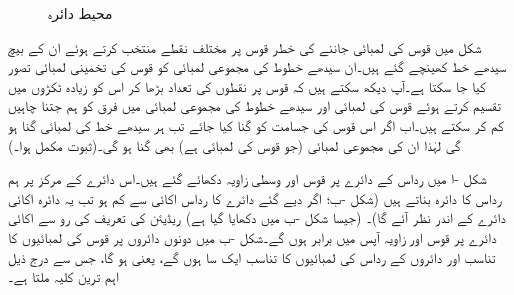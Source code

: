 \begin{figure}
\centering
\begin{minipage}{0.45\textwidth}
\centering
{}
\caption{قوس کی لمبائی}
\label{شکل_ابتدا_قوس_لمبائی}
\end{minipage}\hfill
\begin{minipage}{0.45\textwidth}
\centering
\centering
{}
\caption{محیط دائرہ}
\label{شکل_ابتدا_دائرہ_اور_ریڈیئن}
\end{minipage}%
\end{figure}

شکل  میں قوس کی لمبائی جاننے کی خطر قوس پر مختلف نقطے منتخب کرتے ہوئے ان کے بیچ سیدھے خط کھینچے گئے ہیں۔ان سیدھے خطوط کی مجموعی لمبائی کو قوس کی تخمینی لمبائی تصور کیا جا سکتا ہے۔آپ دیکھ سکتے ہیں کہ قوس پر نقطوں کی تعداد بڑھا کر اس کو زیادہ ٹکڑوں میں تقسیم کرتے ہوئے قوس کی لمبائی اور سیدھے خطوط کی مجموعی لمبائی میں فرق کو ہم جتنا چاہیں کم کر سکتے ہیں۔اب اگر اس قوس کی جسامت کو  گنا کیا جائے تب ہر سیدھے خط کی لمبائی  گنا ہو گی لہٰذا ان کی مجموعی لمبائی (جو قوس کی لمبائی ہے) بھی  گنا ہو گی۔(ثبوت مکمل ہوا۔)


شکل -ا میں رداس  کے دائرے پر قوس  اور وسطی زاویہ  دکھائے گئے ہیں۔اس دائرے کے مرکز پر ہم  رداس کا دائرہ بناتے ہیں (شکل -ب؛ اگر دیے گئے دائرے کا رداس اکائی سے کم ہو تب یہ دائرہ اکائی دائرے کے اندر نظر آئے گا)۔ (جیسا شکل -ب میں دکھایا گیا ہے) ریڈیئن کی تعریف کی رو سے اکائی دائرے پر قوس اور زاویہ آپس میں برابر ہوں گے۔شکل -ب میں دونوں دائروں پر  قوس کی لمبائیوں کا تناسب  اور دائروں کے رداس کی لمبائیوں کا تناسب  ایک  سا   ہوں گے، یعنی   ہو گا، جس سے درج ذیل اہم ترین کلیہ ملتا ہے۔

